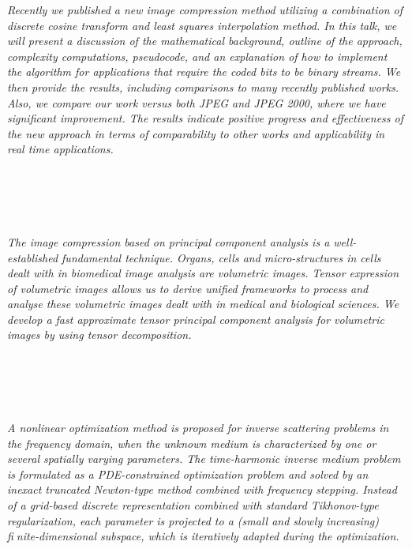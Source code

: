   \begin{multicols}{2}
    \textit{Recently we published a new image compression method utilizing a combination of discrete cosine transform and least squares interpolation method. In this talk, we will present a discussion of the mathematical background, outline of the approach, complexity computations, pseudocode, and an explanation of how to implement the algorithm for applications that require the coded bits to be binary streams. We then provide the results, including comparisons to many recently published works. Also, we compare our work versus both JPEG and JPEG 2000, where we have significant improvement. The results indicate positive progress and effectiveness of the new approach in terms of comparability to other works and applicability in real time applications.}\\
\\ 
      \\
      \\\\
\\
    \textit{The image compression based on principal component analysis  is a well-established fundamental technique. 
Organs, cells and micro-structures in cells dealt with in biomedical image analysis are volumetric images. 
Tensor expression of volumetric images allows us to derive unified frameworks to process and analyse 
these volumetric images dealt with in medical and biological sciences.  
We develop a fast approximate tensor principal component analysis 
for volumetric images by using tensor decomposition. }\\
\\ 
      \\
      \\\\
\\
    \textit{A nonlinear optimization method is proposed for inverse scattering problems in
the frequency domain, when the unknown medium is characterized by one or several
spatially varying parameters. The time-harmonic inverse medium problem is formulated 
as a PDE-constrained optimization problem and solved by an inexact truncated
Newton-type method combined with frequency stepping. Instead of a grid-based 
discrete representation combined with standard Tikhonov-type regularization, 
each parameter is projected to a (small and slowly increasing) finite-dimensional
subspace, which is iteratively adapted during the optimization. }\\

\end{multicols}
